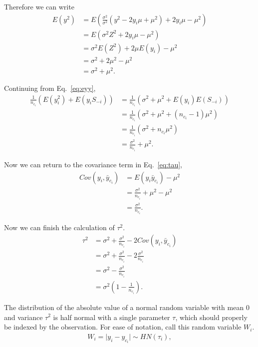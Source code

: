 \noindent Therefore we can write
\begin{align*}
E(y^2) &= E\left(\frac{\sigma^2}{\sigma^2} \left(y^2 - 2y_i\mu + \mu^2\right) + 2y_i\mu - \mu^2\right) \\
&= E\left(\sigma^2 Z^2 + 2y_i\mu - \mu^2\right) \\
&= \sigma^2E(Z^2) + 2\mu E(y_i) - \mu^2 \\
&= \sigma^2 + 2\mu^2 - \mu^2 \\
&= \sigma^2 + \mu^2.
\end{align*}

\noindent Continuing from Eq.~\eqref{eq:eyy}, 
\begin{align*}
\frac{1}{n_{c_i}}\left( E\left(y_i^2\right) + E\left(y_i S_{-i}\right)\right) &= \frac{1}{n_{c_i}}\left(\sigma^2 + \mu^2 + E(y_i)E(S_{-i})\right) \\
&= \frac{1}{n_{c_i}}\left(\sigma^2 + \mu^2 + (n_{c_i} - 1)\mu^2\right) \\
&= \frac{1}{n_{c_i}}\left(\sigma^2 + n_{c_i}\mu^2\right) \\
&= \frac{\sigma^2}{n_{c_i}} + \mu^2.
\end{align*}

\noindent Now we can return to the covariance term in Eq.~\eqref{eq:tau},
\begin{align*}
Cov(y_i, \bar{y}_{c_i}) &= E(y_i \bar{y}_{c_i}) - \mu^2 \\
&= \frac{\sigma^2}{n_{c_i}} + \mu^2 - \mu^2 \\
&= \frac{\sigma^2}{n_{c_i}}.
\end{align*}

\noindent Now we can finish the calculation of $\tau^2$.
\begin{align*}
\tau^2 &= \sigma^2 + \frac{\sigma^2}{n_{c_i}} - 2 Cov(y_i, \bar{y}_{c_i}) \\
&= \sigma^2 + \frac{\sigma^2}{n_{c_i}} - 2 \frac{\sigma^2}{n_{c_i}} \\
&= \sigma^2 - \frac{\sigma^2}{n_{c_i}} \\
&= \sigma^2\left(1 - \frac{1}{n_{c_i}}\right).
\end{align*}

The distribution of the absolute value of a normal random variable with mean 0 and variance $\tau^2$ is half normal with a single parameter $\tau$, which should properly be indexed by the observation. For ease of notation, call this random variable $W_i$.
\begin{align*}
W_i = \lvert y_i - y_{c_i}\rvert \sim HN(\tau_i),
\end{align*}

